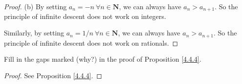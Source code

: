\begin{proof}{(b)}
    By setting \(a_n = -n \ \forall n \in \mathbf{N}\), we can always have \(a_n > a_{n + 1}\).
    So the principle of infinite descent does not work on integers.

    Similarly, by setting \(a_n = 1 / n \ \forall n \in \mathbf{N}\), we can always have \(a_n > a_{n + 1}\).
    So the principle of infinite descent does not work on rationals.
\end{proof}

\begin{exercise}\label{ex 4.4.3}
    Fill in the gaps marked (why?) in the proof of Proposition \ref{4.4.4}.
\end{exercise}

\begin{proof}
    See Proposition \ref{4.4.4}.
\end{proof}